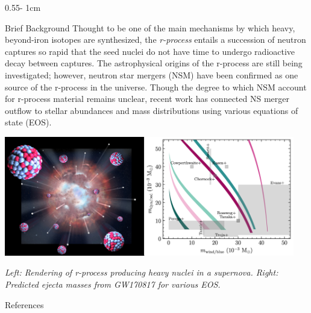 \documentclass{../psuposter}
\begin{document}
\begin{frame}
\begin{columns}[t, totalwidth=\textwidth]
\begin{column}{0.55\textwidth - 1cm}
    \begin{block}{Brief Background}
    	Thought to be one of the main mechanisms by which heavy, beyond-iron isotopes are synthesized, the \textit{r-process} entails a succession of neutron captures so rapid that the seed nuclei do not have time to undergo radioactive decay between captures. The astrophysical origins of the r-process are still being investigated; however, neutron star mergers (NSM) have been confirmed as one source of the r-process in the universe. Though the degree to which NSM account for r-process material remains unclear, recent work has connected NS merger outflow to stellar abundances and mass distributions using various equations of state (EOS). \cite{holmbeckReconstructingMassesMerging2020}\\
        \begin{center}
		   	\includegraphics[width=0.95\textwidth]{images/background}    		
		   	\newline
		   	
		   	\textit{Left: Rendering of r-process producing heavy nuclei in a supernova. \cite{mikamiGreatProgressOrigin}
		   	Right: Predicted ejecta masses from GW170817 for various EOS. \cite{holmbeckReconstructingMassesMerging2020}}
    	\end{center} 
    \end{block}


\nocite{*}
    \begin{block}{References}

        
%        
		
    \end{block}


\end{column}
\end{columns}
\end{frame}
\end{document}
